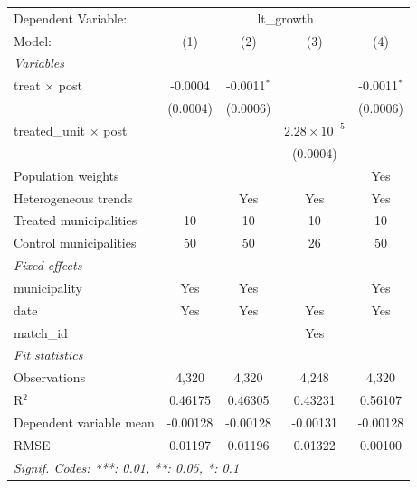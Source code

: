 
\begingroup
\centering
\begin{tabular}{lcccc}
   \tabularnewline \midrule \midrule
   Dependent Variable: & \multicolumn{4}{c}{lt\_growth}\\
   Model:                        & (1)      & (2)           & (3)                   & (4)\\  
   \midrule
   \emph{Variables}\\
   treat $\times$ post           & -0.0004  & -0.0011$^{*}$ &                       & -0.0011$^{*}$\\   
                                 & (0.0004) & (0.0006)      &                       & (0.0006)\\   
   treated\_unit $\times$ post   &          &               & $2.28\times 10^{-5}$  &   \\   
                                 &          &               & (0.0004)              &   \\   
   Population weights            &          &               &                       & Yes\\  
   Heterogeneous trends          &          & Yes           & Yes                   & Yes\\  
   Treated municipalities        & 10       & 10            & 10                    & 10\\  
   Control municipalities        & 50       & 50            & 26                    & 50\\  
   \midrule
   \emph{Fixed-effects}\\
   municipality                  & Yes      & Yes           &                       & Yes\\  
   date                          & Yes      & Yes           & Yes                   & Yes\\  
   match\_id                     &          &               & Yes                   & \\  
   \midrule
   \emph{Fit statistics}\\
   Observations                  & 4,320    & 4,320         & 4,248                 & 4,320\\  
   R$^2$                         & 0.46175  & 0.46305       & 0.43231               & 0.56107\\  
   Dependent variable mean       & -0.00128 & -0.00128      & -0.00131              & -0.00128\\  
   RMSE                          & 0.01197  & 0.01196       & 0.01322               & 0.00100\\  
   \midrule \midrule
   \multicolumn{5}{l}{\emph{Signif. Codes: ***: 0.01, **: 0.05, *: 0.1}}\\
\end{tabular}
\par\endgroup



